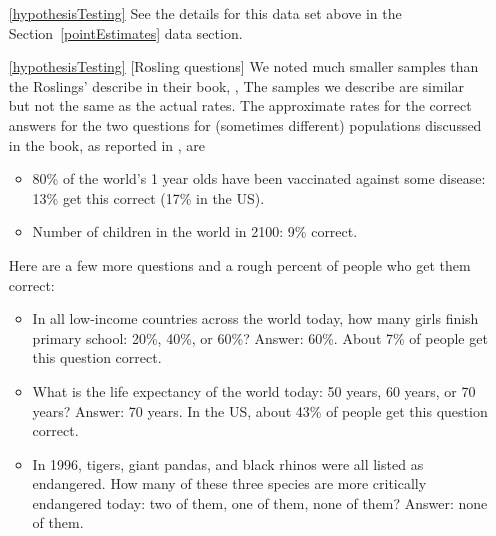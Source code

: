 \begin{itemize}
\item[\ref{hypothesisTesting}]
    See the details for this data set above
    in the Section~\ref{pointEstimates} data section.
\item[\ref{hypothesisTesting}]
    [Rosling questions]
    We noted much smaller samples than the Roslings'
    describe in their book,
    ,
    The samples we describe are similar but not
    the same as the actual rates.
    The approximate rates for the correct answers for the
    two questions for (sometimes different) populations
    discussed in the book, as reported in
    ,
    are
    \begin{itemize}
    \item
        80\% of the world's 1 year olds have been vaccinated
        against some disease:
        13\% get this correct (17\% in the US).
    \item
        Number of children in the world in 2100:
        9\% correct.
    \end{itemize}
    Here are a few more questions and a rough percent
    of people who get them correct:
    \begin{itemize}
    \item
        In all low-income countries across the world today,
        how many girls finish primary school: 20\%, 40\%, or 60\%?
        Answer: 60\%.
        About 7\% of people get this question correct.
    \item
        What is the life expectancy of the world today:
        50 years, 60 years, or 70 years?
        Answer: 70 years.
        In the US, about 43\% of people get this question correct.
    \item
        In 1996, tigers, giant pandas, and black rhinos
        were all listed as endangered.
        How many of these three species are more
        critically endangered today:
        two of them,
        one of them,
        none of them?
        Answer: none of them.

\end{itemize}
\end{itemize}
